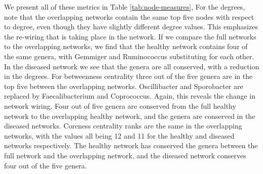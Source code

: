 We present all of these metrics in Table \ref{tab:node-measures}, For the degrees, note that the overlapping networks contain the same top five nodes with respect to degree, even though they have slightly different degree values. This emphasizes the re-wiring that is taking place in the network. If we compare the full networks to the overlapping networks, we find that the healthy network contains four of the same genera, with Gemmiger and Ruminococcus substituting for each other. In the diseased network we see that the genera are all conserved, with a reduction in the degrees. For betweenness centrality three out of the five genera are in the top five between the overlapping networks. Oscillibacter and Sporobacter are replaced by Faecalibacterium and Coprococcus. Again, this reveals the change in network wiring. Four out of five genera are conserved from the full healthy network to the overlapping healthy network, and the genera are conserved in the diseased networks. Coreness centrality ranks are the same in the overlapping networks, with the values all being 12 and 11 for the healthy and diseased networks respectively. The healthy network has conserved the genera between the full network and the overlapping network, and the diseased network conserves four out of the five genera. 

